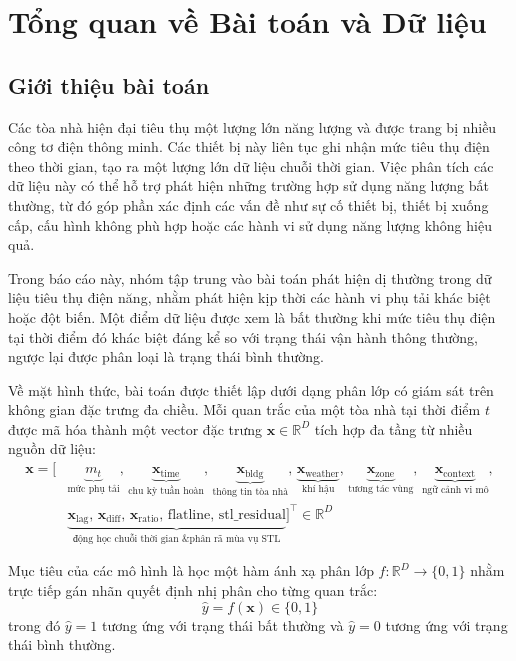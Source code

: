 \section{Tổng quan về Bài toán và Dữ liệu}
\subsection{Giới thiệu bài toán}

Các tòa nhà hiện đại tiêu thụ một lượng lớn năng lượng và được trang bị nhiều công tơ điện thông minh. Các thiết bị này liên tục ghi nhận mức tiêu thụ điện theo thời gian, tạo ra một lượng lớn dữ liệu chuỗi thời gian. Việc phân tích các dữ liệu này có thể hỗ trợ phát hiện những trường hợp sử dụng năng lượng bất thường, từ đó góp phần xác định các vấn đề như sự cố thiết bị, thiết bị xuống cấp, cấu hình không phù hợp hoặc các hành vi sử dụng năng lượng không hiệu quả.

Trong báo cáo này, nhóm tập trung vào bài toán phát hiện dị thường trong dữ liệu tiêu thụ điện năng, nhằm phát hiện kịp thời các hành vi phụ tải khác biệt hoặc đột biến. Một điểm dữ liệu được xem là bất thường khi mức tiêu thụ điện tại thời điểm đó khác biệt đáng kể so với trạng thái vận hành thông thường, ngược lại được phân loại là trạng thái bình thường.

Về mặt hình thức, bài toán được thiết lập dưới dạng phân lớp có giám sát trên không gian đặc trưng đa chiều. Mỗi quan trắc của một tòa nhà tại thời điểm $t$ được mã hóa thành một vector đặc trưng $\mathbf{x} \in \mathbb{R}^D$ tích hợp đa tầng từ nhiều nguồn dữ liệu:
\begin{align*}
    \mathbf{x} = \Big[ & \underbrace{m_t}_{\text{mức phụ tải}}, \, \underbrace{\mathbf{x}_{\text{time}}}_{\text{chu kỳ tuần hoàn}}, \, \underbrace{\mathbf{x}_{\text{bldg}}}_{\text{thông tin tòa nhà}}, \, \underbrace{\mathbf{x}_{\text{weather}}}_{\text{khí hậu}}, \, \underbrace{\mathbf{x}_{\text{zone}}}_{\text{tương tác vùng}}, \, \underbrace{\mathbf{x}_{\text{context}}}_{\text{ngữ cảnh vi mô}}, \\
    & \underbrace{\mathbf{x}_{\text{lag}}, \, \mathbf{x}_{\text{diff}}, \, \mathbf{x}_{\text{ratio}}, \, \text{flatline}, \, \text{stl\_residual}}_{\text{động học chuỗi thời gian \& phân rã mùa vụ STL}} \Big]^\top \in \mathbb{R}^D
\end{align*}

Mục tiêu của các mô hình là học một hàm ánh xạ phân lớp $f: \mathbb{R}^D \to \{0, 1\}$ nhằm trực tiếp gán nhãn quyết định nhị phân cho từng quan trắc:
\begin{equation*}
    \hat{y} = f(\mathbf{x}) \in \{0, 1\}
\end{equation*}
trong đó $\hat{y} = 1$ tương ứng với trạng thái bất thường và $\hat{y} = 0$ tương ứng với trạng thái bình thường.

